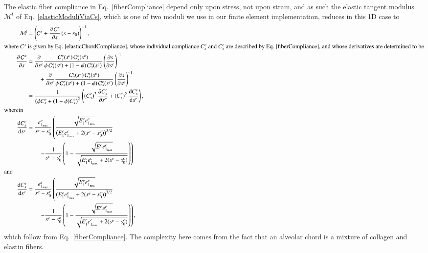 The elastic fiber compliance in Eq.~\ref{fiberCompliance} depend only upon stress, not upon strain, and as such the elastic tangent modulus $\boldsymbol{\mathcal{M}}^t$ of Eq.~\ref{elasticModuliViaCs}, which is one of two moduli we use in our finite element implementation, reduces in this 1D case to
\begin{subequations}
    \label{fiberTangentModulus}
    \begin{align}
    \mathcal{M}^t & = \left( \mathcal{C}^s + \frac{\partial \, \mathcal{C}^s}
    {\partial s} \, (s - s_0) \right)^{-1} , \\
    \intertext{where $C^s$ is given by Eq.~\ref{elasticChordCompliance}, whose individual compliance $C^c_s$ and $C^e_s$ are described by Eq.~\ref{fiberCompliance}, and whose derivatives are determined to be}
    \mbox{} \qquad \frac{\partial \, \mathcal{C}^s}{\partial s} & = 
    \frac{\partial}{\partial s^c} 
    \frac{\mathcal{C}_s^c (s^c) \, \mathcal{C}_s^e (s^e)}
    {\phi \, \mathcal{C}_s^e (s^e) + (1-\phi) \, \mathcal{C}_s^c (s^c)}
    \left( \frac{\partial s}{\partial s^c} \right)^{\! -1} \notag \\ 
    \mbox{} & \qquad + \frac{\partial}{\partial s^e} 
    \frac{\mathcal{C}_s^c (s^c) \, \mathcal{C}_s^e (s^e)} 
    {\phi \, \mathcal{C}_s^e (s^e) + (1-\phi) \, \mathcal{C}_s^c (s^c)}
    \left( \frac{\partial s}{\partial s^e} \right)^{\! -1} \notag \\ 
    & = \frac{1}{\bigl( \phi C^e_s + (1-\phi) C^c_s \bigr)^2} \left(
    (C^e_s)^2 \, \frac{\partial C^c_s}{\partial s^c} + (C^c_s)^2 \,
    \frac{\mathrm{d} C^e_s}{\mathrm{d} s^e} \right), \\
    \intertext{wherein}
    \frac{\mathrm{d}C^c_s}{\mathrm{d}s^c} & = \frac{e^c_{1_{\max}}}{s^c - s^c_0} 
    \left( \frac{\sqrt{E^c_1 e^c_{1_{\max}}}}
    {\bigl( E^c_1 e^c_{1_{\max}} + 2 (s^c - s^c_0) \bigr)^{3/2}} \right. \notag \\
    \mbox{} & \qquad \left. - 
    \frac{1}{s^c-s^c_0} \left( 1 - \frac{\sqrt{E^c_1 e^c_{1_{\max}}}}
    {\sqrt{E^c_1 e^c_{1_{\max}} + 2 (s^c - s^c_0)}} \right) \right) \\
    \intertext{and}
    \frac{\mathrm{d}C^e_s}{\mathrm{d}s^e} & = \frac{e^e_{1_{\max}}}{s^e - s^e_0} 
    \left( \frac{\sqrt{E^e_1 e^e_{1_{\max}}}}
    {\bigl( E^e_1 e^e_{1_{\max}} + 2 (s^e - s^e_0) \bigr)^{3/2}} \right. \notag \\
    \mbox{} & \qquad \left. - 
    \frac{1}{s^e-s^e_0} \left( 1 - \frac{\sqrt{E^e_1 e^e_{1_{\max}}}}
    {\sqrt{E^e_1 e^e_{1_{\max}} + 2 (s^e - s^e_0)}} \right) \right) ,
    \end{align}
\end{subequations}
which follow from Eq.~\ref{fiberCompliance}.  The complexity here comes from the fact that an alveolar chord is a mixture of collagen and elastin fibers.

